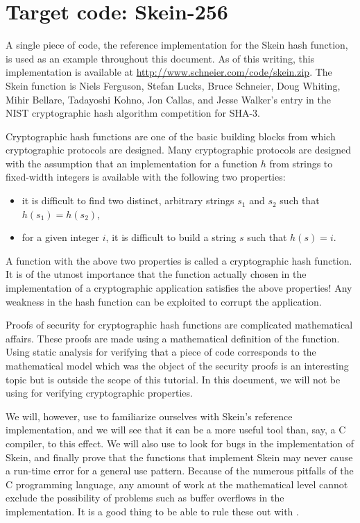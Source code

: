 \documentclass{frama-c-book}
\begin{document}
\section{Target code: Skein-256}

A single piece of code, the reference implementation for the Skein
hash function, is used as an example throughout this document. As of
this writing, this implementation is available at
\url{http://www.schneier.com/code/skein.zip}. The Skein function is
Niels Ferguson, Stefan Lucks, Bruce Schneier, Doug Whiting, Mihir
Bellare, Tadayoshi Kohno, Jon Callas, and Jesse Walker's entry in the
NIST cryptographic hash algorithm competition for SHA-3.

Cryptographic hash functions are one of the basic building blocks from
which cryptographic protocols are designed. Many cryptographic
protocols are designed with the assumption that an implementation for
a function $h$ from strings to fixed-width integers is available with
the following two properties:
\begin{itemize}
\item it is difficult to find two distinct, arbitrary strings $s_1$ and $s_2$
such that $h(s_1)=h(s_2)$,
\item for a given integer $i$, it is difficult to build a string $s$
such that $h(s)=i$.
\end{itemize}
A function with the above two properties is called a cryptographic hash
function. It is of the utmost importance that the function actually
chosen in the implementation of a cryptographic application satisfies the
above properties! Any weakness in the hash function can be
exploited to corrupt the application.

Proofs of security for
cryptographic hash functions are complicated mathematical affairs.
These proofs are made using a mathematical definition
of the function. Using static analysis for verifying that a piece
of code corresponds to the mathematical model
which was the object of the security proofs is an interesting
topic but is outside the scope of this tutorial.
In this document, we will not  be using \Eva{} for
verifying cryptographic properties.

We will, however, use \Eva{} to familiarize ourselves
with Skein's reference implementation, and we will see that
it can be a more useful tool than, say, a C
compiler, to this effect. We will also use \Eva{} to look
for bugs in the implementation of Skein, and finally prove that the
functions that implement Skein may never cause a run-time error for a
general use pattern. Because of the numerous pitfalls of the C
programming language, any amount of work at the
mathematical level cannot exclude the possibility of problems
such as buffer overflows in the implementation.
It is a good thing to be able to rule these out with \Eva{}.
\end{document}
